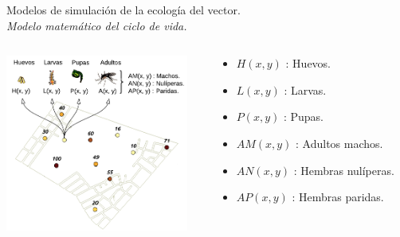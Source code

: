 \begin{frame}[c]{Modelos de simulación de la ecología del vector.\\\textit{Modelo matemático del ciclo de vida.}}
  \begin{center}
   \begin{columns}[T]
        \begin{column}[T]{6cm}
            \includegraphics[width=6cm]{./graphics/modelado-poblacion.png}
        \end{column}
        \begin{column}[T]{5.5cm}
          \begin{itemize}
            \item $H(x, y)$ : Huevos.
            \item $L(x, y)$ : Larvas.
            \item $P(x, y)$ : Pupas.
            \item $AM(x, y)$ : Adultos machos.
            \item $AN(x, y)$ : Hembras nulíperas.
            \item $AP(x, y)$ : Hembras paridas.
          \end{itemize}
        \end{column}
    \end{columns}
  \end{center}
\end{frame}


